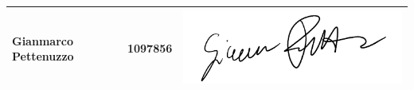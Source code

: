 {\begin{table}[H]
\begin{tabular}{| l | c | >{\centering\arraybackslash}m{8cm}
		|}
	Gianmarco Pettenuzzo & 1097856 & \includegraphics[scale=0.6]{images/firme/giammi.pdf}\\ \hline
\end{tabular}
\end{table}
}
